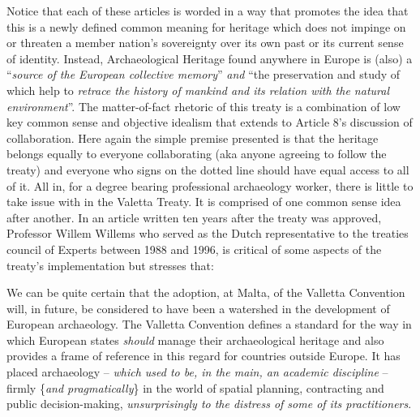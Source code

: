 Notice that each of these articles is worded in a way that promotes the idea that this is a newly defined common meaning for heritage which does not impinge on or threaten a member nation’s sovereignty over its own past or its current sense of identity. Instead, Archaeological Heritage found anywhere in Europe is (also) a “\textit{source of the European collective memory}” \textit{and} “the preservation and study of which help to \textit{retrace the history of mankind and its relation with the natural environment}”. 
The matter-of-fact rhetoric of this treaty is a combination of low key common sense and objective idealism that extends to Article 8’s discussion of collaboration. Here again the simple premise presented is that the heritage belongs equally to everyone collaborating (aka anyone agreeing to follow the treaty) and everyone who signs on the dotted line should have equal access to all of it. All in, for a degree bearing professional archaeology worker, there is little to take issue with in the Valetta Treaty. It is comprised of one common sense idea after another. In an article written ten years after the treaty was approved, Professor Willem Willems who served as the Dutch representative to the treaties council of Experts between 1988 and 1996, is critical of some aspects of the treaty’s implementation but stresses that:

\begin{displayquote}
	We can be quite certain that the adoption, at Malta, of the Valletta Convention will, in future, be considered to have been a watershed in the development of European archaeology. The Valletta Convention defines a standard for the way in which European states \textit{should} manage their archaeological heritage and also provides a frame of reference in this regard for countries outside Europe. It has placed archaeology – \textit{which used to be, in the main, an academic discipline} – firmly \{\textit{and pragmatically}\} in the world of spatial planning, contracting and public decision-making, \textit{unsurprisingly to the distress of some of its practitioners}. %
	\end{displayquote}

